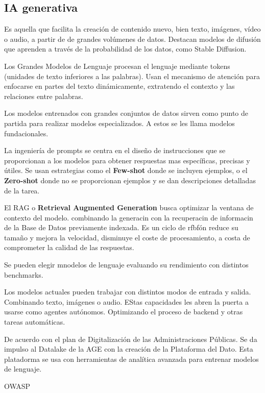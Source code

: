 \subsection{IA generativa}
    Es aquella que facilita la creación de contenido nuevo, bien texto, imágenes, vídeo o audio, a partir de de grandes volúmenes de datos. Destacan modelos de difusión que aprenden a través de la probabilidad de los datos, como Stable Diffusion.

    Los Grandes Modelos de Lenguaje procesan el lenguaje mediante tokens (unidades de texto inferiores a las palabras). Usan el mecanismo de atención para enfocarse en partes del texto dinámicamente, extratendo el contexto y las relaciones entre palabras.

    Los modelos entrenados con grandes conjuntos de datos sirven como punto de partida para realizar modelos especializados. A estos se les llama modelos fundacionales.

    La ingeniería de prompts se centra en el diseño de instrucciones que se proporcionan a los modelos para obtener respuestas mas específicas, precisas y útiles. Se usan estrategias como el \textbf{Few-shot} donde se incluyen ejemplos, o el \textbf{Zero-shot} donde no se proporcionan ejemplos y se dan descripciones detalladas de la tarea.

    El RAG o \textbf{Retrieval Augmented Generation} busca optimizar la ventana de contexto del modelo. combinando la generacin con la recuperacin de informacin de la Base de Datos previamente indexada. Es un ciclo de rfbfón reduce su tamaño y mejora la velocidad, disminuye el coste de procesamiento, a costa de comprometer la calidad de las respuestas.

    Se pueden elegir mnodelos de lenguaje evaluando su rendimiento con distintos benchmarks.

    Los modelos actuales pueden trabajar con distintos modos de entrada y salida. Combinando texto, imágenes o audio. EStas capacidades les abren la puerta a usarse como agentes autónomos. Optimizando el proceso de backend y otras tareas automáticas.

    De acuerdo con el plan de Digitalización de las Administraciones Públicas. Se da impulso al Datalake de la AGE con la creación de la Plataforma del Dato. Esta platadorma se usa con herramientas de analítica avanzada para entrenar modelos de lenguaje.

    OWASP


